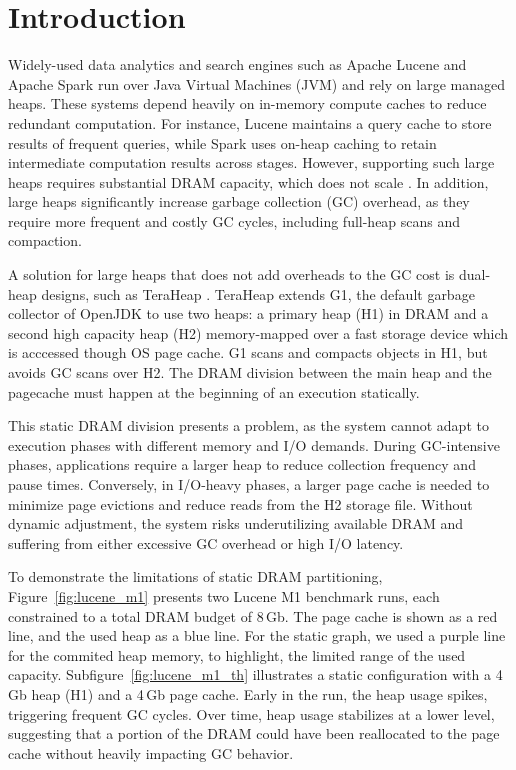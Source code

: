 \section{Introduction}
\label{sec:intro}



Widely-used data analytics and search engines such as Apache Lucene
\cite{klinaftakis2025thesis} and Apache Spark \cite{spark3.3} run over Java Virtual
Machines (JVM) and rely on large managed heaps. These systems depend heavily on in-memory compute caches
to reduce redundant computation. For instance, Lucene maintains a query cache to
store results of frequent queries, while Spark uses on-heap caching to retain 
intermediate computation results across stages. However, supporting such large heaps
requires substantial DRAM capacity, which does not scale \cite{mandelman2002dram, white2011dram}.
In addition, large heaps significantly increase garbage collection (GC) overhead,
as they require more frequent and costly GC cycles, including full-heap scans and compaction. 

A solution for large heaps that does not add overheads to the GC cost is
dual-heap designs, such as TeraHeap \cite{teraheap_asplos}. TeraHeap extends
G1, the default garbage collector of OpenJDK to use two heaps: a primary heap
(H1) in DRAM and a second high capacity heap (H2) memory-mapped over a fast
storage device which is acccessed though OS page cache. G1 scans and compacts
objects in H1, but avoids GC scans over H2. The DRAM division between the main
heap and the pagecache must happen at the beginning of an execution statically.

This static DRAM division presents a problem, as the system cannot adapt to 
execution phases with different memory and I/O demands. During GC-intensive phases,
applications require a larger heap to reduce collection frequency and pause times. 
Conversely, in I/O-heavy phases, a larger page cache is needed to minimize page evictions
and reduce reads from the H2 storage file. Without dynamic adjustment, the system 
risks underutilizing available DRAM and suffering from either excessive GC overhead or high I/O latency.

To demonstrate the limitations of static DRAM partitioning, Figure~\ref{fig:lucene_m1} presents two Lucene 
M1 benchmark runs, each constrained to a total DRAM budget of 8\,Gb. The page cache is shown as a red line, 
and the used heap as a blue line. For the static graph, we used a purple line for the commited heap memory,
to highlight, the limited range of the used capacity. Subfigure~\ref{fig:lucene_m1_th} illustrates a static
configuration with a 4\,Gb heap (H1) and a 4\,Gb page cache. Early in the run, the heap usage spikes, triggering 
frequent GC cycles. Over time, heap usage stabilizes at a lower level, suggesting that a portion of the DRAM could 
have been reallocated to the page cache without heavily impacting GC behavior.

